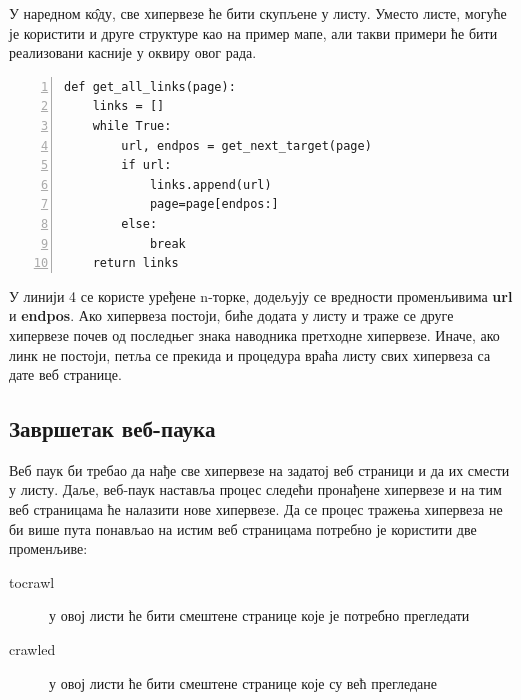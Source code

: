 \documentclass[11pt, serbianc, english, titlepage]{article}
\begin{document}
		У наредном к\^{о}ду, све хипервезе ће бити скупљене у листу. Уместо листе, могуће је користити и друге структуре као на пример мапе, али такви примери ће бити реализовани касније у оквиру овог рада.  
		\begin{lstlisting}[caption=Процедура смештања свих хиперлинкова у листу, label={lst:getalllinks}, numbers=left]
def get_all_links(page):
    links = []
    while True:
        url, endpos = get_next_target(page)
        if url:
            links.append(url)
            page=page[endpos:]
        else:
            break
    return links
		\end{lstlisting}
		У линији 4 се користе уређене n-торке, додељују се вредности променљивима \textbf{url} и \textbf{endpos}. Ако хипервеза постоји, биће додата у листу и траже се друге хипервезе почев од последњег знака наводника претходне хипервезе. Иначе, ако линк не постоји, петља се прекида и процедура враћа листу свих хипервеза са дате веб странице.
	\subsection{Завршетак веб-паука}
	Веб паук би требао да нађе све хипервезе на задатој веб страници и да их смести у листу. Даље, веб-паук наставља процес следећи пронађене хипервезе и на тим веб страницама ће налазити нове хипервезе. Да се процес тражења хипервеза не би више пута понављао на истим веб страницама потребно је користити две променљиве:
	\begin{description}
	\item[tocrawl] у овој листи ће бити смештене странице које је потребно прегледати 
	\item[crawled] у овој листи ће бити смештене странице које су већ прегледане
	\end{description}
\end{document}
